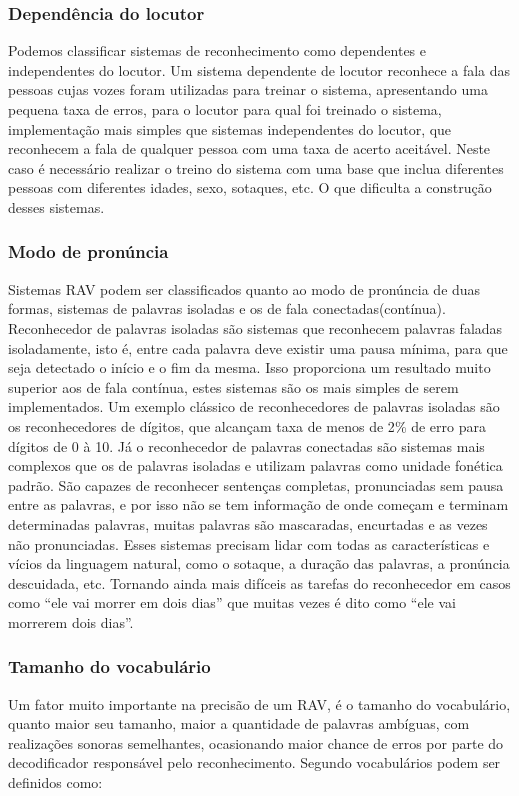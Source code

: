 \subsubsection{Dependência do locutor}
Podemos classificar sistemas de reconhecimento como dependentes e independentes do locutor. Um sistema dependente de locutor reconhece a fala das pessoas cujas vozes foram utilizadas para treinar o sistema, apresentando uma pequena taxa de erros, para o locutor para qual foi treinado o sistema,  implementação mais simples que sistemas independentes do locutor, que reconhecem a fala de qualquer pessoa com uma taxa de acerto aceitável. Neste caso é necessário realizar o treino do sistema com uma base que inclua diferentes pessoas com diferentes idades, sexo, sotaques, etc. O que dificulta a construção desses sistemas.

\subsubsection{Modo de pronúncia}
Sistemas RAV podem ser classificados quanto ao modo de pronúncia de duas formas, sistemas de palavras isoladas e os de fala conectadas(contínua). Reconhecedor de palavras isoladas são sistemas que reconhecem palavras faladas isoladamente, isto é, entre cada palavra deve existir uma pausa mínima, para que seja detectado o início e o fim da mesma. Isso proporciona um resultado muito superior aos de fala contínua, estes sistemas são os mais simples de serem implementados. Um exemplo clássico de reconhecedores de palavras isoladas são os reconhecedores de dígitos, que alcançam taxa de menos de 2{\%} de erro para dígitos de 0 à 10.\cite{RavPtBr}
Já o reconhecedor de palavras conectadas são sistemas mais complexos que os de palavras isoladas e utilizam palavras como unidade fonética padrão. São capazes de reconhecer sentenças completas, pronunciadas sem pausa entre as palavras, e por isso não se tem informação de onde começam e terminam determinadas palavras, muitas palavras são mascaradas, encurtadas e as vezes não pronunciadas. Esses sistemas precisam lidar com todas as características e vícios da linguagem natural, como o sotaque, a duração das palavras, a pronúncia descuidada, etc. Tornando ainda mais difíceis as tarefas do reconhecedor em casos como “ele vai morrer em dois dias” que 
muitas vezes  é dito como “ele vai morrerem dois dias”.\cite{RavPtBr}

\subsubsection{Tamanho do vocabulário}
Um fator muito importante na precisão de um RAV, é o tamanho do vocabulário, quanto maior seu tamanho, maior a quantidade de palavras ambíguas, com realizações sonoras semelhantes, ocasionando maior chance de erros por parte do decodificador responsável pelo reconhecimento.\cite{RavPtBr} Segundo \cite{RavIsoladas} vocabulários podem ser definidos como:

